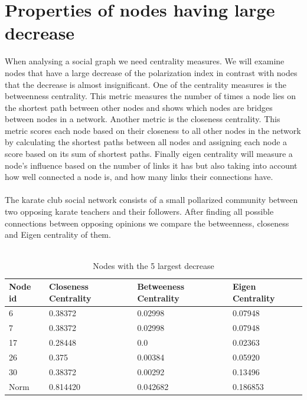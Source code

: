\section{Properties of nodes having  large decrease}
\label{sec:properties}

When analysing a social graph we need centrality measures. We will examine nodes that have a large decrease of the polarization index in contrast with nodes that the decrease is almost insignificant. 
One of the centrality measures is the betweenness centrality. This metric measures the number of times a node lies on the shortest path between other nodes and shows which nodes are bridges between nodes in a network. 
Another metric is the closeness centrality. This metric scores each node based on their closeness to all other nodes in the network by calculating the shortest paths between all nodes and assigning each node a score based on its sum of shortest paths. 
Finally eigen centrality will measure a node's influence based on the number of links it has but also taking into account how well connected a node is, and how many links their connections have.
\\
\\
The karate club social network\cite{nr} consists of a small pollarized community between two opposing karate teachers and their followers. After finding all possible connections between opposing opinions we compare the betweenness, closeness and Eigen centrality of them.
\\
\\

\begin{table}[t]
 \centering
 \caption{Nodes with the 5 largest decrease}
 \label{tab:nodesLargest}
 \begin{tabular}{| l || l | l | l |}
 \hline
  Node id & Closeness Centrality& Betweeness Centrality & Eigen Centrality\\
  \hline
  \hline
  6 & 0.38372 & 0.02998 & 0.07948\\
  \hline
  7 & 0.38372 & 0.02998 & 0.07948\\
  \hline
  17 & 0.28448 & 0.0 &  0.02363\\
  \hline
  26 & 0.375 & 0.00384 & 0.05920\\
  \hline
  30 & 0.38372 & 0.00292 & 0.13496\\
  \hline
  \hline
  Norm & 0.814420 & 0.042682 & 0.186853\\ 
  \hline
 \end{tabular}
\end{table}



